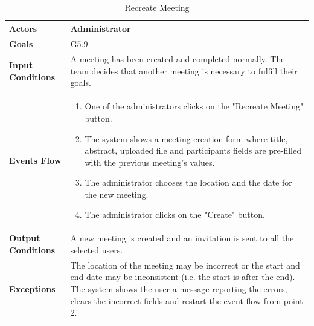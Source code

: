 \begin{table}[H]
	\centering
	\def\arraystretch{1.5}
	\begin{tabular}{|p{7cm}|p{7cm}|}
		\hline
		\textbf{Actors}            & Administrator    \\ \hline
		\textbf{Goals}             & G5.9           \\ \hline
		\textbf{Input Conditions}  & A meeting has been created and completed normally. The team decides that another meeting is necessary to fulfill their goals. \\ \hline
		\textbf{Events Flow}       & 
		\begin{enumerate}[topsep=0pt, leftmargin=*]
			\item One of the administrators clicks on the "Recreate Meeting" button.
			\item The system shows a meeting creation form where title, abstract, uploaded file and participants fields are pre-filled with the previous meeting's values.
			\item The administrator chooses the location and the date for the new meeting.
			\item The administrator clicks on the "Create" button.
		\end{enumerate}              \\ \hline
		\textbf{Output Conditions} & A new meeting is created and an invitation is sent to all the selected users.           \\ \hline
		\textbf{Exceptions}        & The location of the meeting may be incorrect or the start and end date may be inconsistent (i.e. the start is after the end). The system shows the user a message reporting the errors, clears the incorrect fields and restart the event
		flow from point 2.           \\ \hline
	\end{tabular}
	\caption{Recreate Meeting}
\end{table}

